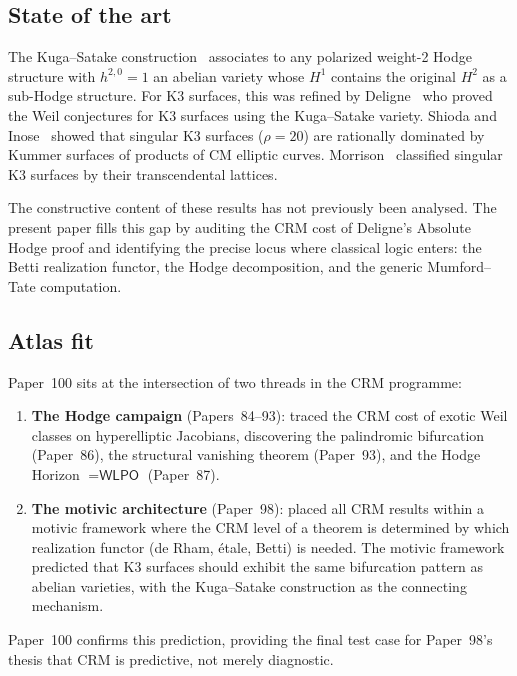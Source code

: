 \documentclass[11pt,a4paper]{article}
\theoremstyle{plain}
\theoremstyle{definition}
\newcommand{\WLPO}{\textsf{WLPO}}
\begin{document}
\subsection{State of the art}

The Kuga--Satake construction~\cite{kuga-satake} associates to any polarized weight-2 Hodge structure with $h^{2,0} = 1$ an abelian variety whose $H^1$ contains the original $H^2$ as a sub-Hodge structure. For K3 surfaces, this was refined by Deligne~\cite{deligne-k3} who proved the Weil conjectures for K3 surfaces using the Kuga--Satake variety. Shioda and Inose~\cite{shioda-inose} showed that singular K3 surfaces ($\rho = 20$) are rationally dominated by Kummer surfaces of products of CM elliptic curves. Morrison~\cite{morrison-k3} classified singular K3 surfaces by their transcendental lattices.

The constructive content of these results has not previously been analysed. The present paper fills this gap by auditing the CRM cost of Deligne's Absolute Hodge proof and identifying the precise locus where classical logic enters: the Betti realization functor, the Hodge decomposition, and the generic Mumford--Tate computation.

\subsection{Atlas fit}

Paper~100 sits at the intersection of two threads in the CRM programme:

\begin{enumerate}[label=(\roman*)]
  \item \textbf{The Hodge campaign} (Papers~84--93): traced the CRM cost of exotic Weil classes on hyperelliptic Jacobians, discovering the palindromic bifurcation (Paper~86), the structural vanishing theorem (Paper~93), and the Hodge Horizon $= \WLPO$ (Paper~87).

  \item \textbf{The motivic architecture} (Paper~98): placed all CRM results within a motivic framework where the CRM level of a theorem is determined by which realization functor (de Rham, \'etale, Betti) is needed. The motivic framework predicted that K3 surfaces should exhibit the same bifurcation pattern as abelian varieties, with the Kuga--Satake construction as the connecting mechanism.
\end{enumerate}

Paper~100 confirms this prediction, providing the final test case for Paper~98's thesis that CRM is predictive, not merely diagnostic.
\end{document}
